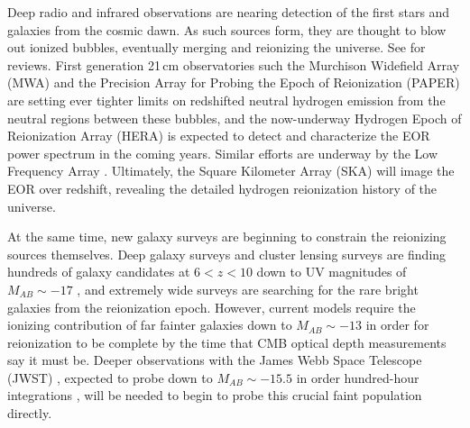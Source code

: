 \documentclass[numberedappendix]{emulateapj}
\begin{document}
Deep radio and infrared observations are nearing detection of the first stars and galaxies from the cosmic dawn. As such sources form, they are thought to blow out ionized bubbles, eventually merging and reionizing the universe. See \citet{FurlanettoReview,miguelreview,PritchardLoebReview,Mesinger16} for reviews. First generation 21\,cm observatories such the Murchison Widefield Array (MWA) \citep{tingay13,mwascience} and the Precision Array for Probing the Epoch of Reionization (PAPER) \citep{parsons14,ali15,PoberPAPER64Heating,DannyMultiRedshift} are setting ever tighter limits on redshifted neutral hydrogen emission from the neutral regions between these bubbles, and the now-underway Hydrogen Epoch of Reionization Array (HERA) \citep{deboer16,neben16b,ewallwice16,patra16} is expected to detect and characterize the EOR power spectrum in the coming years. Similar efforts are underway by the Low Frequency Array \citep{lofareorpaper,lofar}. Ultimately, the Square Kilometer Array (SKA)  \citep{ska,ska1,ska2,ska3} will image the EOR over redshift, revealing the detailed hydrogen reionization history of the universe. 

At the same time, new galaxy surveys are beginning to constrain the reionizing sources themselves. Deep galaxy surveys \citep{Bowler2017,Roberts-Borsani2016,Bowler2015,Wilkins12015,Bouwens2015,Bouwens2013,Dunlop2013,Illingworth2013,Ellis2013,Robertson2013,Oesch2013,Grogin2011,Bouwens2011} and cluster lensing surveys \citep{Livermore2016,Ebeling2016,McLeod2016,Bouwens2016,Bouwens2016a,Coe2015,Huang2015,McLeod2015,Atek2015} are finding hundreds of galaxy candidates at $6<z<10$ down to UV magnitudes of $M_{AB}\sim-17$ \citep{Finkelstein2015}, and extremely wide surveys are searching for the rare bright galaxies \citep{Bernard2016,Calvi,Schmidt2014,Bradley2012,Trenti2011} from the reionization epoch. However, current models require the ionizing contribution of far fainter galaxies down to $M_{AB}\sim-13$ \citep{Bouwens2016b,Alvarez2012} in order for reionization to be complete by the time that CMB optical depth measurements \citep{planck16} say it must be. Deeper observations with the James Webb Space Telescope (JWST) \citep{Gardner2006}, expected to probe down to $M_{AB}\sim-15.5$ in order hundred-hour integrations \citep{Finkelstein2015}, will be needed to begin to probe this crucial faint population directly.
\end{document}
